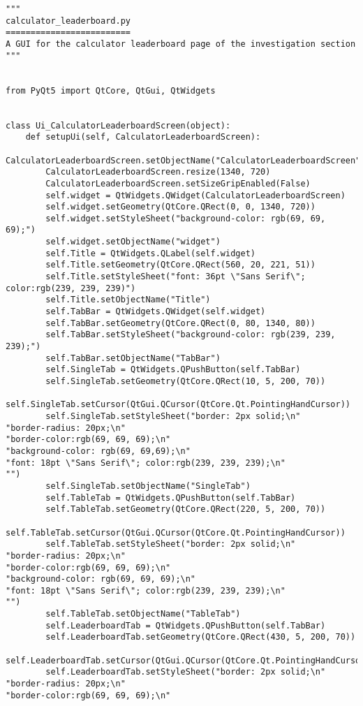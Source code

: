 \documentclass{article}
\begin{document}
\begin{lstlisting}
"""
calculator_leaderboard.py
=========================
A GUI for the calculator leaderboard page of the investigation section
"""


from PyQt5 import QtCore, QtGui, QtWidgets


class Ui_CalculatorLeaderboardScreen(object):
    def setupUi(self, CalculatorLeaderboardScreen):
        CalculatorLeaderboardScreen.setObjectName("CalculatorLeaderboardScreen")
        CalculatorLeaderboardScreen.resize(1340, 720)
        CalculatorLeaderboardScreen.setSizeGripEnabled(False)
        self.widget = QtWidgets.QWidget(CalculatorLeaderboardScreen)
        self.widget.setGeometry(QtCore.QRect(0, 0, 1340, 720))
        self.widget.setStyleSheet("background-color: rgb(69, 69, 69);")
        self.widget.setObjectName("widget")
        self.Title = QtWidgets.QLabel(self.widget)
        self.Title.setGeometry(QtCore.QRect(560, 20, 221, 51))
        self.Title.setStyleSheet("font: 36pt \"Sans Serif\"; color:rgb(239, 239, 239)")
        self.Title.setObjectName("Title")
        self.TabBar = QtWidgets.QWidget(self.widget)
        self.TabBar.setGeometry(QtCore.QRect(0, 80, 1340, 80))
        self.TabBar.setStyleSheet("background-color: rgb(239, 239, 239);")
        self.TabBar.setObjectName("TabBar")
        self.SingleTab = QtWidgets.QPushButton(self.TabBar)
        self.SingleTab.setGeometry(QtCore.QRect(10, 5, 200, 70))
        self.SingleTab.setCursor(QtGui.QCursor(QtCore.Qt.PointingHandCursor))
        self.SingleTab.setStyleSheet("border: 2px solid;\n"
"border-radius: 20px;\n"
"border-color:rgb(69, 69, 69);\n"
"background-color: rgb(69, 69,69);\n"
"font: 18pt \"Sans Serif\"; color:rgb(239, 239, 239);\n"
"")
        self.SingleTab.setObjectName("SingleTab")
        self.TableTab = QtWidgets.QPushButton(self.TabBar)
        self.TableTab.setGeometry(QtCore.QRect(220, 5, 200, 70))
        self.TableTab.setCursor(QtGui.QCursor(QtCore.Qt.PointingHandCursor))
        self.TableTab.setStyleSheet("border: 2px solid;\n"
"border-radius: 20px;\n"
"border-color:rgb(69, 69, 69);\n"
"background-color: rgb(69, 69, 69);\n"
"font: 18pt \"Sans Serif\"; color:rgb(239, 239, 239);\n"
"")
        self.TableTab.setObjectName("TableTab")
        self.LeaderboardTab = QtWidgets.QPushButton(self.TabBar)
        self.LeaderboardTab.setGeometry(QtCore.QRect(430, 5, 200, 70))
        self.LeaderboardTab.setCursor(QtGui.QCursor(QtCore.Qt.PointingHandCursor))
        self.LeaderboardTab.setStyleSheet("border: 2px solid;\n"
"border-radius: 20px;\n"
"border-color:rgb(69, 69, 69);\n"

\end{lstlisting}
\end{document}
